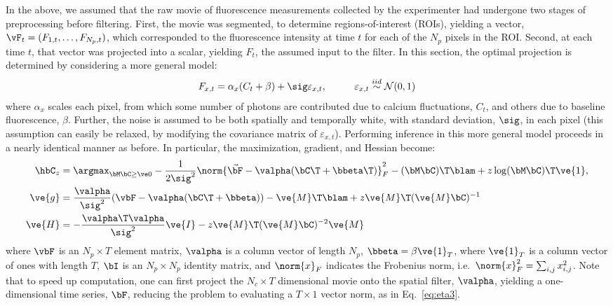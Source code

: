 In the above, we assumed that the raw movie of fluorescence measurements collected by the experimenter had undergone two stages of preprocessing before filtering.  First, the movie was segmented, to determine regions-of-interest (ROIs), yielding a vector, $\vF_t=(F_{1,t}, \ldots, F_{N_p,t})$, which corresponded to the fluorescence intensity at time $t$ for each of the $N_p$ pixels in the ROI.  Second, at each time $t$, that vector was projected into a scalar, yielding $F_t$, the assumed input to the filter.  In this section, the optimal projection is determined by considering a more general model:
\begin{align} \label{eq:bF}
F_{x,t} &= \alpha_x (C_t + \beta) +  \sig \varepsilon_{x,t}, \qquad &\varepsilon_{x,t} \overset{iid}{\sim} \mathcal{N}(0,1)   
\end{align}
\noindent where $\alpha_x$ scales each pixel, from which some number of photons are contributed due to calcium fluctuations, $C_t$, and others due to baseline fluorescence, $\beta$.  Further, the noise is assumed to be both spatially and temporally white, with standard deviation, $\sig$, in each pixel (this assumption can easily be relaxed, by modifying the covariance matrix of $\varepsilon_{x,t}$).  Performing inference in this more general model proceeds in a  nearly identical manner as before. In particular, the maximization, gradient, and Hessian become:
\begin{align} 
\hbC_{\zzz} 
&= \az  -\frac{1}{2 \sig^2} \norm{\vec{\bF} - \valpha (\bC\T +\bbeta\T)}_F^2 - (\bM \bC )\T \blam  + \zzz \log(\bM \bC)\T\ve{1},  \label{eq:eta4}\\
\ve{g} &= \frac{\valpha}{\sig^2}(\vbF -\valpha({\bC\T} + \bbeta)) - \ve{M}\T\blam + \zzz \ve{M}\T (\ve{M} \bC)^{-1} \label{eq:g2} \\
\ve{H} &= -\frac{\valpha\T \valpha}{\sig^2} \ve{I} - \zzz \ve{M}\T (\ve{M} \bC)^{-2} \ve{M} \label{eq:H2}
\end{align}
\noindent where $\vbF$ is an $N_p \times T$ element matrix, $\valpha$ is a column vector of length $N_p$,  $\bbeta=\beta \ve{1}_T$, where $\ve{1}_T$ is a column vector of ones with length $T$, $\bI$ is an $N_p \times N_p$ identity matrix, and $\norm{x}_F$ indicates the Frobenius norm, i.e.\ $\norm{x}_F^2= \sum_{i,j} x_{i,j}^2$.  Note that to speed up computation, one can first project the $N_c \times T$ dimensional movie onto the spatial filter, $\valpha$, yielding a one-dimensional time series, $\bF$, reducing the problem to evaluating a $T \times 1$ vector norm, as in Eq.~\eqref{eq:eta3}.

